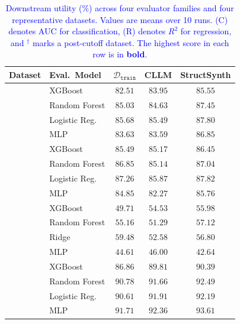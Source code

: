 \begin{table}[t]
\small
\centering
\setlength{\tabcolsep}{0.9mm}
{\color{blue}
\begin{tabular}{ll|ccc}
    \hline
    \textbf{Dataset} & \textbf{Eval.\ Model} & $\mathcal{D}_\mathtt{train}$ & \textbf{CLLM} & \textbf{StructSynth} \\
    \hline
    & XGBoost & $82.51$ & $83.95$ & $\boldsymbol{85.55}$ \\
    & Random Forest & $85.03$ & $84.63$ & $\boldsymbol{87.45}$ \\
    & Logistic Reg. & $85.68$ & $85.49$ & $\boldsymbol{87.80}$ \\
    & MLP & $83.63$ & $83.59$ & $\boldsymbol{86.85}$ \\
    \hline
    & XGBoost & $85.49$ & $85.17$ & $\boldsymbol{86.45}$ \\
    & Random Forest & $86.85$ & $85.14$ & $\boldsymbol{87.04}$ \\
    & Logistic Reg. & $87.26$ & $85.87$ & $\boldsymbol{87.82}$ \\
    & MLP & $84.85$ & $82.27$ & $\boldsymbol{85.76}$ \\
    \hline
    & XGBoost & $49.71$ & $54.53$ & $\boldsymbol{55.98}$ \\
    & Random Forest & $55.16$ & $51.29$ & $\boldsymbol{57.12}$ \\
    & Ridge & $\boldsymbol{59.48}$ & $52.58$ & $56.80$ \\
    & MLP & $44.61$ & $\boldsymbol{46.00}$ & $42.64$ \\
    \hline
    & XGBoost & $86.86$ & $89.81$ & $\boldsymbol{90.39}$ \\
    & Random Forest & $90.78$ & $91.66$ & $\boldsymbol{92.49}$ \\
    & Logistic Reg. & $90.61$ & $91.91$ & $\boldsymbol{92.19}$ \\
    & MLP & $91.71$ & $92.36$ & $\boldsymbol{93.61}$ \\
    \hline
\end{tabular}
}
\caption{\textcolor{blue}{Downstream utility (\%) across four evaluator families and four representative datasets. Values are means over 10 runs. (C) denotes AUC for classification, (R) denotes $R^2$ for regression, and $^\dag$ marks a post-cutoff dataset. The highest score in each row is in \textbf{bold}.}}
\label{tab:downstream_sensitivity}
\end{table}



